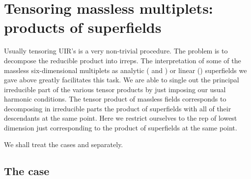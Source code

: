 \documentclass[a4paper,12pt]{article}
\begin{document}
\section{Tensoring massless multiplets: products of superfields}


Usually tensoring UIR's is a very non-trivial procedure. The 
problem is to decompose the reducible product into irreps.  The 
interpretation of some of the massless six-dimensional multiplets 
as analytic (\coordHE{} and \coordHE{}) or linear (\coordHE{}) superfields we 
gave above greatly facilitates this task. We are able to single 
out the principal irreducible part of the various tensor products 
by just imposing our usual harmonic conditions. The tensor product 
of massless fields corresponds to decomposing
in irreducible parts the product of superfields with all of their 
descendants at the same point. Here we restrict ourselves to the rep of lowest
dimension just corresponding to the product of superfields at the same point.

We shall treat the 
cases \coordHE{} and \coordHE{} separately.  


\subsection{The case \coordHE{}}
\end{document}
